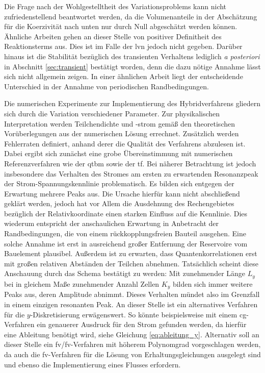 Die Frage nach der Wohlgestelltheit des Variationsproblems kann nicht zufriedenstellend beantwortet werden, da die Volumenanteile in der Abschätzung für die Koerzivität nach unten nur durch Null abgeschätzt werden können. Ähnliche Arbeiten \cite{feistauer2007} gehen an dieser Stelle von positiver Definitheit des Reaktionsterms aus. Dies ist im Falle der \ac{lvn} jedoch nicht gegeben. Darüber hinaus ist die Stabilität bezüglich des transienten Verhaltens lediglich \emph{a posteriori} in Abschnitt \ref{sec:transient} bestätigt worden, denn die dazu nötige Annahme lässt sich nicht allgemein zeigen. In einer ähnlichen Arbeit \cite{NLS} liegt der entscheidende Unterschied in der Annahme von periodischen Randbedingungen.

Die numerischen Experimente zur Implementierung des Hybridverfahrens gliedern sich durch die Variation verschiedener Parameter. Zur physikalischen Interpretation werden Teilchendichte und -strom gemäß den theoretischen Vorüberlegungen aus der numerischen Lösung errechnet. Zusätzlich werden Fehlerraten definiert, anhand derer die Qualität des Verfahrens abzulesen ist. Dabei ergibt sich zunächst eine grobe Übereinstimmung mit numerischen Referenzverfahren wie der \ac{qtbm} sowie der \ac{tf}. Bei näherer Betrachtung ist jedoch insbesondere das Verhalten des Stromes am ersten zu erwartenden Resonanzpeak der Strom-Spannungskennlinie problematisch. Es bilden sich entgegen der Erwartung mehrere Peaks aus. Die Ursache hierfür kann nicht abschließend geklärt werden, jedoch hat vor Allem die Ausdehnung des Rechengebietes bezüglich der Relativkoordinate einen starken Einfluss auf die Kennlinie. Dies wiederum entspricht der anschaulichen Erwartung in Anbetracht der Randbedingungen, die von einem rückkopplungsfreien Bauteil ausgehen. Eine solche Annahme ist erst in ausreichend großer Entfernung der Reservoire vom Bauelement plausibel. Außerdem ist zu erwarten, dass Quantenkorrelationen erst mit großen relativen Abständen der Teilchen abnehmen. Tatsächlich scheint diese Anschauung  durch das Schema bestätigt zu werden: Mit zunehmender Länge $L_y$ bei in gleichem Maße zunehmender Anzahl Zellen $K_y$ bilden sich immer weitere Peaks aus, deren Amplitude  abnimmt. Dieses Verhalten mündet also im Grenzfall in einem einzigen resonanten Peak. An dieser Stelle ist ein alternatives Verfahren für die $y$-Diskretisierung erwägenswert. So könnte beispielsweise mit einem \ac{cg}-Verfahren ein genauerer Ausdruck für den Strom gefunden werden, da hierfür eine Ableitung benötigt wird, siehe Gleichung \eqref{eq:ableitung_y}. Alternativ soll an dieser Stelle ein \ac{fv}/\ac{fv}-Verfahren mit höherem Polynomgrad vorgeschlagen werden, da auch die \ac{fv}-Verfahren für die Lösung von Erhaltungsgleichungen ausgelegt sind und ebenso die Implementierung eines Flusses erfordern.

